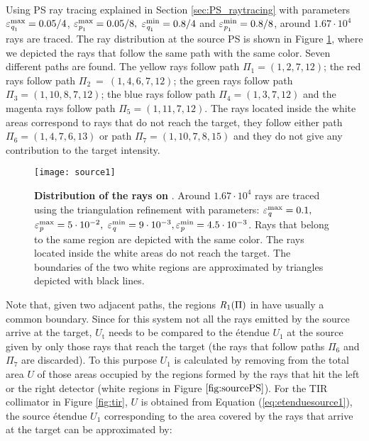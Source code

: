 \\ \indent
Using PS ray tracing explained in Section \ref{sec:PS_raytracing} with parameters $\varepsilon_{\textit{q}_1}^{\textrm{max}} = 0.05/4$, $ \varepsilon_{\textit{p}_1}^\textrm{max} = 0.05/8, $ $\varepsilon_{\textit{q}_1}^\textrm{min} = 0.8/4$ and $\varepsilon_{\textit{p}_1}^\textrm{min} = 0.8/8$, around $1.67 \cdot 10^4$ rays are traced. The ray distribution at the source PS  is shown in Figure \ref{fig:sourcePS}, where we depicted the rays that follow the same path with the same color. Seven different paths are found. The yellow rays follow path $\Pi_1 = (1, 2, 7, 12)$;
   the red rays follow path $\Pi_2 ~= ~(1, 4, 6, 7, 12)$; the green rays follow path $\Pi_3 = (1, 10, 8, 7, 12)$;
   the blue rays follow path $\Pi_4= (1, 3, 7, 12)$ and the magenta rays follow path $\Pi_5= (1, 11, 7, 12)$. The rays located inside the white areas correspond to rays that do not reach the target, they follow either path $\Pi_6 = (1, 4, 7, 6, 13)$ or path $\Pi_7 = (1,10,7,8,15)$ and they do not give any contribution to the target intensity.
\begin{figure}[t]
\label{fig:sourcePS}
  \begin{center}
  \texttt{[image: source1]}
  \end{center}
  \caption{\textbf{Distribution of the rays on }. Around $1.67 \cdot 10^4$ rays are traced using the triangulation refinement with parameters:
  $\varepsilon_{\textit{q}}^\textrm{max} = 0.1 ,$ $ \varepsilon_{\textit{p}}^\textrm{max} = 5\cdot 10^{-2}, $ $\varepsilon_{\textit{q}}^\textrm{min} = 9\cdot 10^{-3}, \varepsilon_{\textit{p}}^\textrm{min} = 4.5 \cdot 10^{-3}$. Rays that belong to the same region are depicted with the same color. The rays located inside the white areas do not reach the target. The boundaries of the two white regions are approximated by triangles depicted with black lines.}
 \label{fig:sourcePS}
\end{figure}
Note that, given two adjacent paths, the regions $\mbox{$\emph{R}_{\textit{$1$}}$}(\Pi)$ in  have usually a common boundary. 
Since for this system not all the rays emitted by the source arrive at the target, $U_{\textrm{t}}$ needs to be compared to the \'{e}tendue $U_1$ at the source given by only those rays that reach the target (the rays that follow paths $\Pi_6$ and 
$\Pi_7$ are discarded). To this purpose $U_1$ is calculated by removing from the total area $U$ of  those areas occupied by the regions formed by the rays that hit the left or the right detector (white regions in Figure $\ref{fig:sourcePS}$).  For the TIR collimator in Figure \ref{fig:tir}, $U$ is obtained from Equation (\ref{eq:etenduesource1}), the source \'{e}tendue $U_1$ corresponding to the area covered by the rays that arrive at the target can be approximated by:
